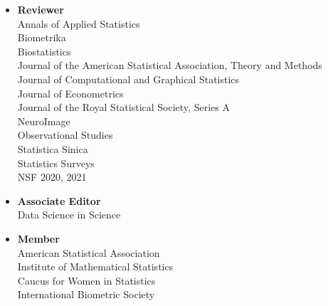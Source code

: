 \documentclass[11pt]{article}
\newcommand{\tab}{\hspace*{2em}}
\begin{document}
\begin{itemize}
	\item[] \textbf{Reviewer}  \\
	\tab Annals of Applied Statistics \\ 
	\tab Biometrika \\
	\tab Biostatistics \\
	\tab Journal of the American Statistical Association, Theory and Methods \\
	\tab Journal of Computational and Graphical Statistics \\ 
	\tab Journal of Econometrics \\
	\tab Journal of the Royal Statistical Society, Series A \\
	\tab NeuroImage \\
	\tab Observational Studies \\
	\tab Statistica Sinica \\
	\tab Statistics Surveys \\ 
	\tab NSF 2020, 2021 \vspace{-2mm}
	\item[] \textbf{Associate Editor}  \\
	\tab Data Science in Science \vspace{-2mm}
	\item[] \textbf{Member} \\
	\tab American Statistical Association \\
	\tab  Institute of Mathematical Statistics \\
	\tab Caucus for Women in Statistics \\
	\tab  International Biometric Society 
\end{itemize}
\end{document}
